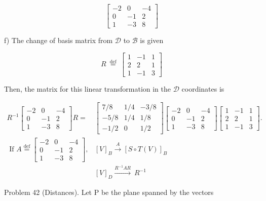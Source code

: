 \documentclass[10pt]{article}
\begin{document}
$$
\left[\begin{array}{ccc}
-2 & 0 & -4 \\
0 & -1 & 2 \\
1 & -3 & 8
\end{array}\right]
$$

f) The change of basis matrix from $\mathcal{D}$ to $\mathcal{B}$ is given

$$
R \stackrel{\text { def }}{=}\left[\begin{array}{ccc}
1 & -1 & 1 \\
2 & 2 & 1 \\
1 & -1 & 3
\end{array}\right]
$$

Then, the matrix for this linear transformation in the $\mathcal{D}$ coordinates is

$$
\begin{aligned}
R^{-1}\left[\begin{array}{ccc}
-2 & 0 & -4 \\
0 & -1 & 2 \\
1 & -3 & 8
\end{array}\right] R= & {\left[\begin{array}{ccc}
7 / 8 & 1 / 4 & -3 / 8 \\
-5 / 8 & 1 / 4 & 1 / 8 \\
-1 / 2 & 0 & 1 / 2
\end{array}\right]\left[\begin{array}{ccc}
-2 & 0 & -4 \\
0 & -1 & 2 \\
1 & -3 & 8
\end{array}\right]\left[\begin{array}{ccc}
1 & -1 & 1 \\
2 & 2 & 1 \\
1 & -1 & 3
\end{array}\right] . } \\
\text { If } A \stackrel{\operatorname{def}}{=}\left[\begin{array}{ccc}
-2 & 0 & -4 \\
0 & -1 & 2 \\
1 & -3 & 8
\end{array}\right], & {[V]_{B} \xrightarrow{A}[S \circ T(V)]_{B} } \\
& {[V]_{D} \xrightarrow{R^{-1} A R} \ R^{-1} }
\end{aligned}
$$

Problem 42 (Distances). Let P be the plane spanned by the vectors
\end{document}
